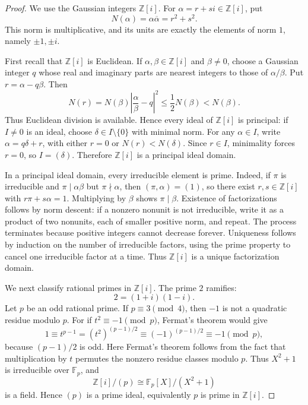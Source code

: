\documentclass{article}
\theoremstyle{plain}
\theoremstyle{remark}
\theoremstyle{myconjecture}
\theoremstyle{plain}
\theoremstyle{definition}
\numberwithin{equation}{section} %
\begin{document}
\begin{proof}
We use the Gaussian integers \(\mathbb Z[i]\).  For
\(\alpha=r+si\in\mathbb Z[i]\), put
\[
        N(\alpha)=\alpha\overline\alpha=r^2+s^2.
\]
This norm is multiplicative, and its units are exactly the elements of norm
\(1\), namely \(\pm1,\pm i\).

First recall that \(\mathbb Z[i]\) is Euclidean.  If
\(\alpha,\beta\in\mathbb Z[i]\) and \(\beta\ne0\), choose a Gaussian integer
\(q\) whose real and imaginary parts are nearest integers to those of
\(\alpha/\beta\).  Put \(r=\alpha-q\beta\).  Then
\[
        N(r)=N(\beta)\left|\frac{\alpha}{\beta}-q\right|^2
        \le \frac{1}{2}N(\beta)<N(\beta).
\]
Thus Euclidean division is available.  Hence every ideal of \(\mathbb Z[i]\)
is principal: if \(I\ne0\) is an ideal, choose \(\delta\in I\setminus\{0\}\)
with minimal norm.  For any \(\alpha\in I\), write
\(\alpha=q\delta+r\), with either \(r=0\) or \(N(r)<N(\delta)\).  Since
\(r\in I\), minimality forces \(r=0\), so \(I=(\delta)\).  Therefore
\(\mathbb Z[i]\) is a principal ideal domain.

In a principal ideal domain, every irreducible element is prime.  Indeed, if
\(\pi\) is irreducible and \(\pi\mid\alpha\beta\) but \(\pi\nmid\alpha\), then
\((\pi,\alpha)=(1)\), so there exist \(r,s\in\mathbb Z[i]\) with
\(r\pi+s\alpha=1\).  Multiplying by \(\beta\) shows \(\pi\mid\beta\).
Existence of factorizations follows by norm descent: if a nonzero nonunit is
not irreducible, write it as a product of two nonunits, each of smaller
positive norm, and repeat.  The process terminates because positive integers
cannot decrease forever.  Uniqueness follows by induction on the number of
irreducible factors, using the prime property to cancel one irreducible factor
at a time.  Thus \(\mathbb Z[i]\) is a unique factorization domain.

We next classify rational primes in \(\mathbb Z[i]\).  The prime \(2\) ramifies:
\[
        2=(1+i)(1-i).
\]
Let \(p\) be an odd rational prime.  If \(p\equiv3\pmod4\), then \(-1\) is not a
quadratic residue modulo \(p\).  For if \(t^2\equiv-1\pmod p\), Fermat's theorem
would give
\[
        1\equiv t^{p-1}=(t^2)^{(p-1)/2}
        \equiv (-1)^{(p-1)/2}\equiv -1\pmod p,
\]
because \((p-1)/2\) is odd.  Here Fermat's theorem follows from the fact that
multiplication by \(t\) permutes the nonzero residue classes modulo \(p\).
Thus \(X^2+1\) is irreducible over \(\mathbb F_p\), and
\[
        \mathbb Z[i]/(p)\cong \mathbb F_p[X]/(X^2+1)
\]
is a field.  Hence \((p)\) is a prime ideal, equivalently \(p\) is prime in
\(\mathbb Z[i]\).


\end{proof}
\end{document}
